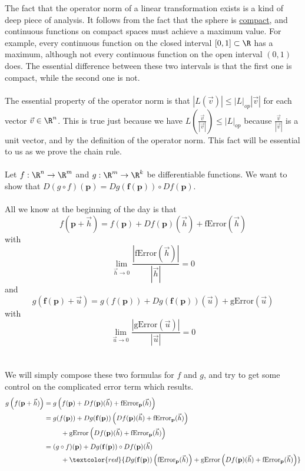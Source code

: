 \documentclass{ximera}
\begin{document}
	The fact that the operator norm of a linear transformation exists is a kind of deep piece of analysis.  It follows from the fact that the sphere is
	\href{http://en.wikipedia.org/wiki/Compact_space}{compact}, and continuous functions on compact spaces must achieve a maximum value.  For example, every continuous function on the closed interval
	$[0,1] \subset \R$ has a maximum, although not every continuous function on the open interval $(0,1)$ does.  The essential difference between 
	these two intervals is that the first one is compact, while the second one is not.
	\\
	\\
	The essential property of the operator norm is that $|L(\vec{v})| \leq |L|_{op} |\vec{v}|$ for each vector $\vec{v} \in \R^n$.  This is true just because we have 
	$L(\frac{\vec{v}}{|\vec{v}|}) \leq |L|_{op}$ because $\frac{\vec{v}}{|\vec{v}|}$ is a unit vector, and by the definition of the operator norm.  This fact will be essential 
	to us as we prove the chain rule.
	\\
	\\
	Let $f:\R^n \to \R^m$ and $g:\R^m \to \R^k$ be differentiable functions.  
	We want to show that $D(g \circ f)(\mathbf{p}) = Dg(\mathbf{f(p)}) \circ Df(\mathbf{p})$.
	\\
	\\
	All we know at the beginning of the day is that  
	\[f(\mathbf{p}+\vec{h}) = f(\mathbf{p})+Df(\mathbf{p})(\vec{h})+\text{fError}(\vec{h})\]
	 with 
	\[\lim_{\vec{h} \to 0} \frac{\left| \text{fError}(\vec{h})\right|}{|\vec{h}|} = 0\]
	 and 
	 \[g(\mathbf{f(p)}+\vec{u}) = g(f(\mathbf{p}))+Dg(\mathbf{f(p)})(\vec{u})+\text{gError}(\vec{u})\]
	 with 
	\[ \lim_{\vec{u} \to 0} \frac{\left| \text{gError}(\vec{u})\right|}{|\vec{u}|} = 0\]
	\\
	\\
	We will simply compose these two formulas for $f$ and $g$, and try to get some control on the complicated error term which results.
	\begin{align*}
	g\left(f(\mathbf{p}+\vec{h})\right) &= g\left( f(\mathbf{p})+Df(\mathbf{p})(\vec{h})+\text{fError}_{\mathbf{p}}(\vec{h})\right)\\
		&= g(f(\mathbf{p}))+Dg(\mathbf{f(p)})\left(Df(\mathbf{p})(\vec{h})+ \text{fError}_{\mathbf{p}}(\vec{h})\right)\\
		&\hphantom{dsdsd}+\text{gError}\left(Df(\mathbf{p})(\vec{h})+\text{fError}_{\mathbf{p}}(\vec{h})\right)\\
		&= (g \circ f)(\mathbf{p})+Dg(\mathbf{f(p)}) \circ Df(\mathbf{p})(\vec{h})\\
		&\hphantom{dsdsd}+ \textcolor{red}{Dg(\mathbf{f(p)})\left(\text{fError}_{\mathbf{p}}(\vec{h})\right) + \text{gError}\left(Df(\mathbf{p})(\vec{h})+\text{fError}_{\mathbf{p}}(\vec{h})\right)}\\
	\end{align*}
	
\end{document}
